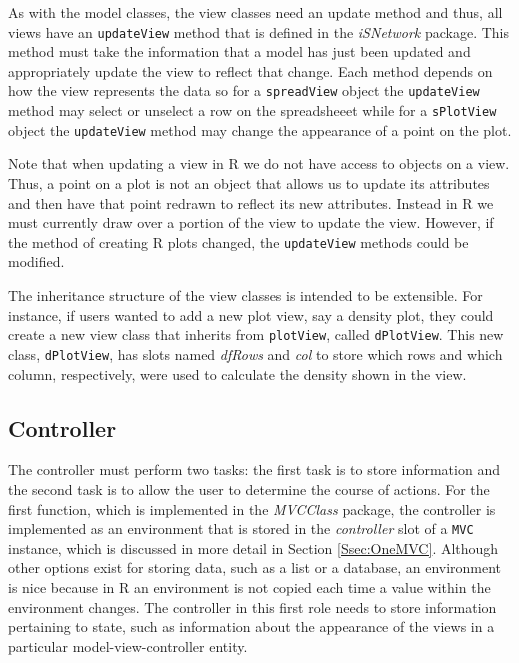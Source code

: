 \documentclass{article}[11pt]
\newcommand{\Rfunction}[1]{{\texttt{#1}}}
\newcommand{\Robject}[1]{{\texttt{#1}}}
\newcommand{\Rpackage}[1]{{\textit{#1}}}
\newcommand{\Rslot}[1]{\textsl{#1}}
\begin{document}
As with the model classes, the view classes need an update method and thus, all
views have an \Rfunction{updateView} method that is defined in the
\Rpackage{iSNetwork} package.  This method must take the
information that a model has just been updated and appropriately update the
view to reflect that change.  Each method depends on how the view
represents the data so for a \Robject{spreadView} object the
\Rfunction{updateView} method may select or unselect a row on the spreadsheeet
while for a \Robject{sPlotView} object the \Rfunction{updateView} method may
change the appearance of a point on the plot.  

Note that when updating a view in R we do not have access to objects on a
view.  Thus, a point on a plot is not an object that allows us to update its
attributes and then have that point redrawn to reflect its new attributes.
Instead in R we must currently draw over a portion of the view to update the
view.  However, if the method of creating R plots changed, the
\Rfunction{updateView} methods could be modified. 

The inheritance structure of the view classes is intended to be extensible.
For instance, if users wanted to add a new plot view, say a density plot, they
could create a new view class that inherits from \Robject{plotView}, called
\Robject{dPlotView}.  This new class, \Robject{dPlotView}, has slots
named \Rslot{dfRows} and \Rslot{col} to store which rows and which column,
respectively, were used to calculate the density shown in the view.

\subsection{Controller}\label{Ssec:OneCont}

The controller must perform two tasks: the first task is to store information
and the second task is to allow the user to determine the course of actions.
For the first function, which is implemented in the \Rpackage{MVCClass}
package, the controller is implemented as an environment that is stored in the
\Rslot{controller} slot of a \Robject{MVC} instance, which is discussed in
more detail in Section \ref{Ssec:OneMVC}.  Although other options exist for
storing data, such as a list or a database, an environment is nice because in
R an environment is not copied each time a value within the environment
changes.  The controller in this first role needs to store information
pertaining to state, such as information about the appearance of the views in
a particular model-view-controller entity.
\end{document}
